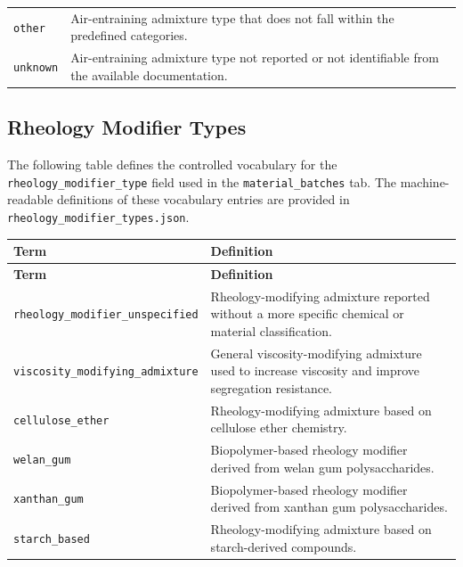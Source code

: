 \documentclass[11pt]{book}
\begin{document}
{\begin{longtable}{p{}p{}}
\texttt{other} &
Air-entraining admixture type that does not fall within the predefined categories. \\

\texttt{unknown} &
Air-entraining admixture type not reported or not identifiable from the available documentation. \\

\hline
\end{longtable}

\subsection{Rheology Modifier Types}
\label{vocab:rheology_modifier_type_list}

The following table defines the controlled vocabulary for the \texttt{rheology\_modifier\_type} field used in the \texttt{material\_batches} tab. The machine-readable definitions of these vocabulary entries are provided in \texttt{rheology\_modifier\_types.json}.

\begin{longtable}{p{}p{}}
\hline
\textbf{Term} & \textbf{Definition} \\
\hline
\endfirsthead

\hline
\textbf{Term} & \textbf{Definition} \\
\hline
\endhead

\texttt{rheology\_modifier\_unspecified} &
Rheology-modifying admixture reported without a more specific chemical or material classification. \\

\texttt{viscosity\_modifying\_admixture} &
General viscosity-modifying admixture used to increase viscosity and improve segregation resistance. \\

\texttt{cellulose\_ether} &
Rheology-modifying admixture based on cellulose ether chemistry. \\

\texttt{welan\_gum} &
Biopolymer-based rheology modifier derived from welan gum polysaccharides. \\

\texttt{xanthan\_gum} &
Biopolymer-based rheology modifier derived from xanthan gum polysaccharides. \\

\texttt{starch\_based} &
Rheology-modifying admixture based on starch-derived compounds. \\


\end{longtable}}
\end{document}
